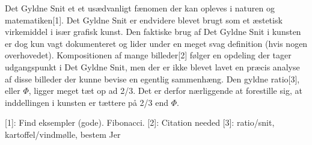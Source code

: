 Det Gyldne Snit et et usædvanligt fænomen der kan opleves i naturen og
matematiken[1]. Det Gyldne Snit er endvidere blevet brugt som et æstetisk
virkemiddel i især grafisk kunst. Den faktiske brug af Det Gyldne Snit i
kunsten er dog kun vagt dokumenteret og lider under en meget svag definition
(hvis nogen overhovedet). Kompositionen af mange billeder[2] følger en
opdeling der tager udgangspunkt i Det Gyldne Snit, men der er ikke blevet
lavet en præcis analyse af disse billeder der kunne bevise en egentlig
sammenhæng. Den gyldne ratio[3], eller $\Phi$, ligger meget tæt op ad 2/3. Det
er derfor nærliggende at forestille sig, at inddellingen i kunsten er tættere
på 2/3 end $\Phi$.

[1]: Find eksempler (gode). Fibonacci.
[2]: Citation needed
[3]: ratio/snit, kartoffel/vindmølle, bestem Jer

